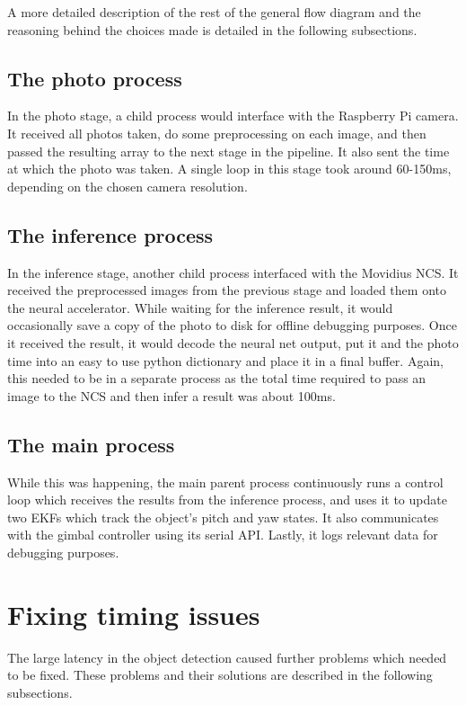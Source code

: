 A more detailed description of the rest of the general flow diagram and the reasoning behind the choices made is detailed in the following subsections.

\subsection{The photo process}
In the photo stage, a child process would interface with the Raspberry Pi camera. It received all photos taken, do some preprocessing on each image, and then passed the resulting array to the next stage in the pipeline. It also sent the time at which the photo was taken. A single loop in this stage took around 60-150ms, depending on the chosen camera resolution.

\subsection{The inference process}
In the inference stage, another child process interfaced with the Movidius NCS. It received the preprocessed images from the previous stage and loaded them onto the neural accelerator. While waiting for the inference result, it would occasionally save a copy of the photo to disk for offline debugging purposes. Once it received the result, it would decode the neural net output, put it and the photo time into an easy to use python dictionary and place it in a final buffer. Again, this needed to be in a separate process as the total time required to pass an image to the NCS and then infer a result was about 100ms.

\subsection{The main process}
While this was happening, the main parent process continuously runs a control loop which receives the results from the inference process, and uses it to update two EKFs which track the object's pitch and yaw states. It also communicates with the gimbal controller using its serial API. Lastly, it logs relevant data for debugging purposes.



\section{Fixing timing issues}
The large latency in the object detection caused further problems which needed to be fixed. These problems and their solutions are described in the following subsections.

